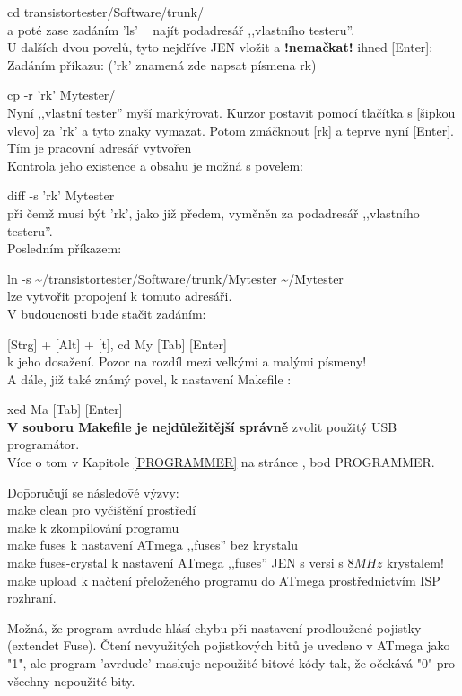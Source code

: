 cd transistortester/Software/trunk/\\
a poté zase zadáním 'ls'   ~ najít podadresář ,,vlastního testeru''.\\
U dalších dvou povelů, tyto nejdříve JEN vložit a {\bf !nemačkat!} ihned [Enter]:\\
Zadáním příkazu: ('rk' znamená zde napsat písmena rk)

cp -r 'rk' Mytester/\\
Nyní ,,vlastní tester'' myší markýrovat. Kurzor postavit pomocí tlačítka s [šipkou vlevo] za 'rk' a tyto znaky vymazat. Potom zmáčknout [rk] a teprve nyní [Enter]. Tím je pracovní adresář vytvořen\\
Kontrola jeho existence a obsahu je možná s povelem:

diff -s 'rk' Mytester\\
při čemž musí být 'rk', jako již předem, vyměněn za podadresář ,,vlastního testeru''.\\
Posledním příkazem:

ln -s \textasciitilde/transistortester/Software/trunk/Mytester \textasciitilde/Mytester\\
lze vytvořit propojení k tomuto adresáři.\\
V budoucnosti bude stačit zadáním:

[Strg] + [Alt] + [t], cd My [Tab] [Enter]\\
k jeho dosažení. Pozor na rozdíl mezi velkými a malými písmeny!\\   
A dále, již také známý povel, k nastavení Makefile :

xed Ma [Tab] [Enter]\\
{\bf V souboru Makefile je nejdůležitější správně} zvolit použitý USB programátor.\\
Více o tom v Kapitole \ref{PROGRAMMER} na stránce \pageref{PROGRAMMER}, bod PROGRAMMER.
\vspace{-0,3 cm}
\begin{tabbing}
Do\=poručují se následo\=vé výzvy:\\
\> make clean \> pro vyčištění prostředí\\
\> make       \> k zkompilování programu\\
\> make fuses \> k nastavení  ATmega ,,fuses'' bez krystalu\\
\> make fuses-crystal \> k nastavení  ATmega ,,fuses'' JEN s versi s \(8MHz\) krystalem!\\
\> make upload \>k načtení přeloženého programu do ATmega prostřednictvím ISP rozhraní.
\end{tabbing}\vspace{-0,3 cm}
Možná, že program avrdude hlásí chybu při nastavení prodloužené pojistky (extendet Fuse).
Čtení nevyužitých pojistkových bitů je uvedeno v ATmega jako "1", ale
program 'avrdude' maskuje nepoužité bitové kódy tak, že očekává "0" pro všechny nepoužité bity.

